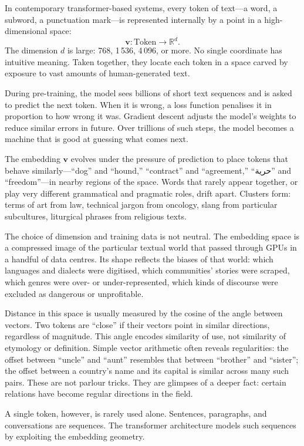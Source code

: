 \documentclass[12pt,a4paper]{report}
\begin{document}
In contemporary transformer-based systems, every token of text---a word, a subword, a punctuation mark---is represented internally by a point in a high-dimensional space:
\[
\mathbf{v} : \text{Token} \rightarrow \mathbb{R}^{d}.
\]
The dimension $d$ is large: 768, 1\,536, 4\,096, or more. No single coordinate has intuitive meaning. Taken together, they locate each token in a space carved by exposure to vast amounts of human-generated text.

During pre-training, the model sees billions of short text sequences and is asked to predict the next token. When it is wrong, a loss function penalises it in proportion to how wrong it was. Gradient descent adjusts the model's weights to reduce similar errors in future. Over trillions of such steps, the model becomes a machine that is good at guessing what comes next.

The embedding $\mathbf{v}$ evolves under the pressure of prediction to place tokens that behave similarly---``dog'' and ``hound,'' ``contract'' and ``agreement,'' ``\textarabic{حرية}'' and ``freedom''---in nearby regions of the space. Words that rarely appear together, or play very different grammatical and pragmatic roles, drift apart. Clusters form: terms of art from law, technical jargon from oncology, slang from particular subcultures, liturgical phrases from religious texts.

The choice of dimension and training data is not neutral. The embedding space is a compressed image of the particular textual world that passed through GPUs in a handful of data centres. Its shape reflects the biases of that world: which languages and dialects were digitised, which communities' stories were scraped, which genres were over- or under-represented, which kinds of discourse were excluded as dangerous or unprofitable.

Distance in this space is usually measured by the cosine of the angle between vectors. Two tokens are ``close'' if their vectors point in similar directions, regardless of magnitude. This angle encodes similarity of use, not similarity of etymology or definition. Simple vector arithmetic often reveals regularities: the offset between ``uncle'' and ``aunt'' resembles that between ``brother'' and ``sister''; the offset between a country's name and its capital is similar across many such pairs. These are not parlour tricks. They are glimpses of a deeper fact: certain relations have become regular directions in the field.

A single token, however, is rarely used alone. Sentences, paragraphs, and conversations are sequences. The transformer architecture models such sequences by exploiting the embedding geometry.
\end{document}
